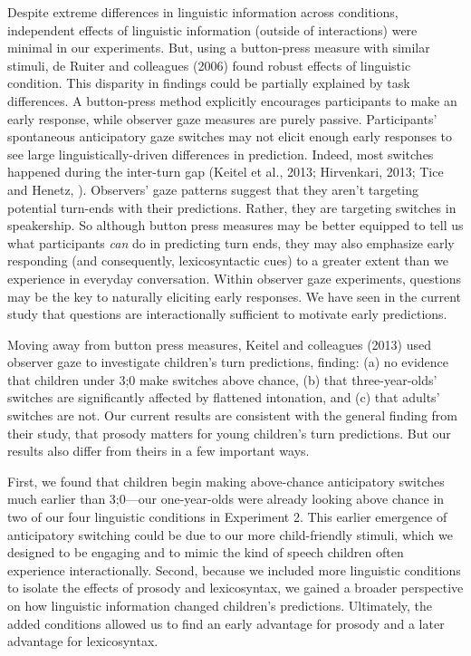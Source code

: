 \documentclass[authoryear, 12pt]{elsarticle}
\begin{document}
Despite extreme differences in linguistic information across conditions, independent effects of linguistic information (outside of interactions) were minimal in our experiments. But, using a button-press measure with similar stimuli, de Ruiter and colleagues (2006) found robust effects of linguistic condition. This disparity in findings could be partially explained by task differences. A button-press method explicitly encourages participants to make an early response, while observer gaze measures are purely passive. Participants' spontaneous anticipatory gaze switches may not elicit enough early responses to see large linguistically-driven differences in prediction. Indeed, most switches happened during the inter-turn gap (Keitel et al., 2013; Hirvenkari, 2013; Tice and Henetz, \citeyear{TiceHenetz11}). Observers' gaze patterns suggest that they aren't targeting potential turn-ends with their predictions. Rather, they are targeting switches in speakership. So although button press measures may be better equipped to tell us what participants \textit{can} do in predicting turn ends, they may also emphasize early responding (and consequently, lexicosyntactic cues) to a greater extent than we experience in everyday conversation. Within observer gaze experiments, questions may be the key to naturally eliciting early responses. We have seen in the current study that questions are interactionally sufficient to motivate early predictions.

Moving away from button press measures, Keitel and colleagues (2013) used observer gaze to investigate children's turn predictions, finding: (a) no evidence that children under 3;0 make switches above chance, (b) that three-year-olds' switches are significantly affected by flattened intonation, and (c) that adults' switches are not. Our current results are consistent with the general finding from their study, that prosody matters for young children's turn predictions. But our results also differ from theirs in a few important ways. 

First, we found that children begin making above-chance anticipatory switches much earlier than 3;0---our one-year-olds were already looking above chance in two of our four linguistic conditions in Experiment 2. This earlier emergence of anticipatory switching could be due to our more child-friendly stimuli, which we designed to be engaging and to mimic the kind of speech children often experience interactionally. Second, because we included more linguistic conditions to isolate the effects of prosody and lexicosyntax, we gained a broader perspective on how linguistic information changed children's predictions. Ultimately, the added conditions allowed us to find an early advantage for prosody and a later advantage for lexicosyntax.
\end{document}
